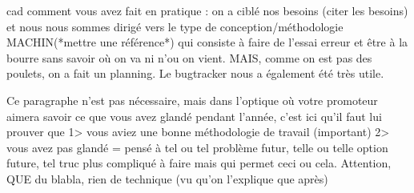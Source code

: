     cad comment vous avez fait en pratique : on a ciblé nos besoins (citer les besoins) et nous nous sommes
    dirigé vers le type de conception/méthodologie MACHIN(*mettre une référence*) qui consiste à faire de l'essai erreur et être à la bourre 
sans savoir où on va ni n'ou on vient. MAIS, comme on est pas des poulets, on a fait un planning. Le bugtracker nous a également été très utile.

Ce paragraphe n'est pas nécessaire, mais dans l'optique où votre promoteur aimera savoir ce que vous avez glandé pendant l'année, c'est ici qu'il 
faut lui prouver que 1> vous aviez une bonne méthodologie de travail (important) 2> vous avez pas glandé = pensé à tel ou tel problème futur, telle ou telle option future, tel truc plus compliqué à faire mais qui permet ceci ou cela.
Attention, QUE du blabla, rien de technique (vu qu'on l'explique que après)
